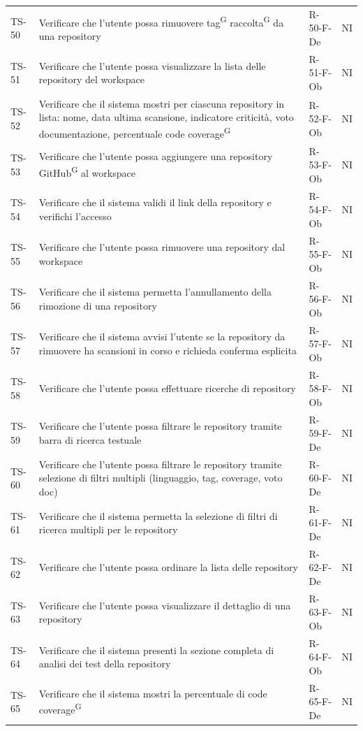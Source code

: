 \documentclass[a4paper, 11pt]{article}
\begin{document}
\begin{longtable}{>{\centering\arraybackslash}m{1.2cm} >{\raggedright\arraybackslash}p{8.2cm} >{\centering\arraybackslash}m{2.5cm} >{\centering\arraybackslash}m{1.2cm}}
TS-50 & Verificare che l'utente possa rimuovere tag\textsuperscript{G} raccolta\textsuperscript{G} da una repository & R-50-F-De & NI \\
TS-51 & Verificare che l'utente possa visualizzare la lista delle repository del workspace & R-51-F-Ob & NI \\
TS-52 & Verificare che il sistema mostri per ciascuna repository in lista: nome, data ultima scansione, indicatore criticità, voto documentazione, percentuale code coverage\textsuperscript{G} & R-52-F-Ob & NI \\
TS-53 & Verificare che l'utente possa aggiungere una repository GitHub\textsuperscript{G} al workspace & R-53-F-Ob & NI \\
TS-54 & Verificare che il sistema validi il link della repository e verifichi l'accesso & R-54-F-Ob & NI \\
TS-55 & Verificare che l'utente possa rimuovere una repository dal workspace & R-55-F-Ob & NI \\
TS-56 & Verificare che il sistema permetta l'annullamento della rimozione di una repository & R-56-F-Ob & NI \\
TS-57 & Verificare che il sistema avvisi l'utente se la repository da rimuovere ha scansioni in corso e richieda conferma esplicita & R-57-F-Ob & NI \\
TS-58 & Verificare che l'utente possa effettuare ricerche di repository & R-58-F-Ob & NI \\
TS-59 & Verificare che l'utente possa filtrare le repository tramite barra di ricerca testuale & R-59-F-De & NI \\
TS-60 & Verificare che l'utente possa filtrare le repository tramite selezione di filtri multipli (linguaggio, tag, coverage, voto doc) & R-60-F-De & NI \\
TS-61 & Verificare che il sistema permetta la selezione di filtri di ricerca multipli per le repository & R-61-F-De & NI \\
TS-62 & Verificare che l'utente possa ordinare la lista delle repository & R-62-F-De & NI \\
TS-63 & Verificare che l'utente possa visualizzare il dettaglio di una repository & R-63-F-Ob & NI \\
TS-64 & Verificare che il sistema presenti la sezione completa di analisi dei test della repository & R-64-F-Ob & NI \\
TS-65 & Verificare che il sistema mostri la percentuale di code coverage\textsuperscript{G} & R-65-F-De & NI \\

\end{longtable}
\end{document}
